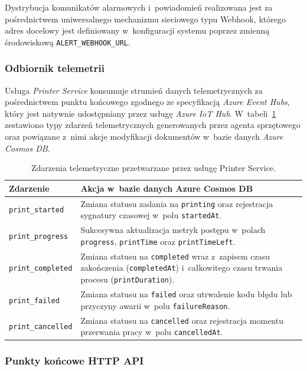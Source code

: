 \documentclass[a4paper,12pt,reqno]{article}
\begin{document}
\noindent Dystrybucja komunikatów alarmowych i~powiadomień realizowana jest za pośrednictwem uniwersalnego mechanizmu sieciowego typu Webhook, którego adres docelowy jest definiowany w~konfiguracji systemu poprzez zmienną środowiskową \texttt{ALERT\_WEBHOOK\_URL}.

\subsubsection{Odbiornik telemetrii}

Usługa \textit{Printer Service} konsumuje strumień danych telemetrycznych za pośrednictwem punktu końcowego zgodnego ze specyfikacją \textit{Azure Event Hubs}, który jest natywnie udostępniany przez usługę \textit{Azure IoT Hub}. W~tabeli~\ref{tab:telemetry_events} zestawiono typy zdarzeń telemetrycznych generowanych przez agenta sprzętowego oraz powiązane z~nimi akcje modyfikacji dokumentów w~bazie danych \textit{Azure Cosmos DB}.

\begin{table}[H]
	\centering
	\caption{Zdarzenia telemetryczne przetwarzane przez usługę Printer Service.}
	\label{tab:telemetry_events}
	\begin{tabular}{lp{10cm}}
		\toprule
		\textbf{Zdarzenie} & \textbf{Akcja w~bazie danych Azure Cosmos DB} \\
		\midrule
		\texttt{print\_started} & Zmiana statusu zadania na \texttt{printing} oraz rejestracja sygnatury czasowej w~polu \texttt{startedAt}. \\
		\addlinespace
		\texttt{print\_progress} & Sukcesywna aktualizacja metryk postępu w~polach \texttt{progress}, \texttt{printTime} oraz \texttt{printTimeLeft}. \\
		\addlinespace
		\texttt{print\_completed} & Zmiana statusu na \texttt{completed} wraz z~zapisem czasu zakończenia (\texttt{completedAt}) i~całkowitego czasu trwania procesu (\texttt{printDuration}). \\
		\addlinespace
		\texttt{print\_failed} & Zmiana statusu na \texttt{failed} oraz utrwalenie kodu błędu lub przyczyny awarii w~polu \texttt{failureReason}. \\
		\addlinespace
		\texttt{print\_cancelled} & Zmiana statusu na \texttt{cancelled} oraz rejestracja momentu przerwania pracy w~polu \texttt{cancelledAt}. \\
		\bottomrule
	\end{tabular}
\end{table}

\subsubsection{Punkty końcowe HTTP API}
\end{document}
